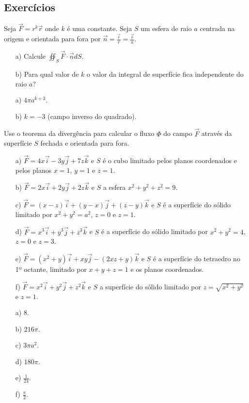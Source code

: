 \subsection*{Exercícios}
\begin{exer}
 Seja $\vec{F}=r^k\vec{r}$ onde $k$ é uma constante. Seja $S$ um esfera de raio $a$ centrada na origem e orientada para fora por $\vec{n}=\frac{\vec{r}}{r}=\frac{\vec{r}}{a}$. 
 \begin{itemize}
  \item[a)] Calcule $\oiint_S\vec{F}\cdot \vec{n}dS$.
  \item[b)] Para qual valor de $k$ o valor da integral de superfície fica independente do raio $a$?
 \end{itemize}
\end{exer}
\begin{resp}
 \begin{itemize}
  \item[a)] $4\pi a^{k+3}$.
  \item[b)] $k=-3$ (campo inverso do quadrado).
 \end{itemize} 
\end{resp}

\begin{exer}
 Use o teorema da divergência para calcular o fluxo $\Phi$ do campo $\vec{F}$ através da superfície $S$ fechada e orientada para fora.
 \begin{itemize}
  \item[a)] $\vec{F}=4x\vec{i}-3y\vec{j}+7z\vec{k}$ e $S$ é o cubo limitado pelos planos coordenados e pelos planos $x=1$, $y=1$ e $z=1$.
  \item[b)] $\vec{F}=2x\vec{i}+2y\vec{j}+2z\vec{k}$ e $S$ a esfera $x^2+y^2+z^2=9$.
  \item[c)] $\vec{F}=(x-z)\vec{i}+(y-x)\vec{j}+(z-y)\vec{k}$ e $S$ é a superfície do sólido limitado por $x^2+y^2=a^2$, $z=0$ e $z=1$.
  \item[d)] $\vec{F}=x^3\vec{i}+y^3\vec{j}+z^3\vec{k}$ e $S$ é a superfície do sólido limitado por $x^2+y^2=4$, $z=0$ e $z=3$.
  \item[e)] $\vec{F}=(x^2+y)\vec{i}+xy\vec{j}-(2xz+y)\vec{k}$ e $S$ é a superfície do tetraedro no 1º octante, limitado por $x+y+z=1$ e os planos coordenados.
  \item[f)] $\vec{F}=x^2\vec{i}+y^2\vec{j}+z^2\vec{k}$ e $S$ a superfície do sólido limitado por $z=\sqrt{x^2+y^2}$ e $z=1$.
 \end{itemize}
\end{exer}
\begin{resp}
\begin{itemize}
 \item[a)] $8$.
 \item[b)] $216\pi$. 
 \item[c)] $3\pi a^2$. 
 \item[d)] $180\pi$.
 \item[e)] $\frac{1}{24}$. 
 \item[f)] $\frac{\pi}{2}$. 
\end{itemize}
\end{resp}



